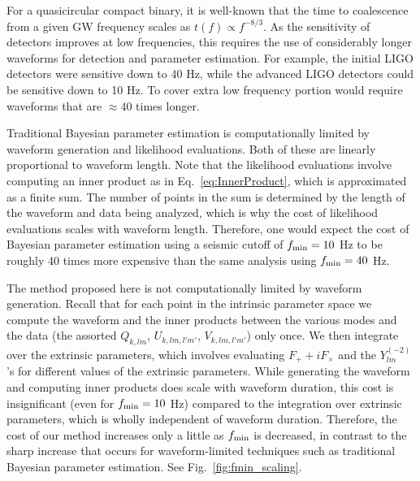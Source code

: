 For a quasicircular compact binary, it is well-known that the time to coalescence from a given GW frequency scales as
$t(f) \propto f^{-8/3}$. As the sensitivity of detectors improves at low frequencies, this requires the use of considerably
longer waveforms for detection and parameter estimation. For example, the initial LIGO detectors were sensitive down
to 40 Hz, while the advanced LIGO detectors could be sensitive down to 10 Hz. To cover extra low frequency
portion would require waveforms that are $\approx 40$ times longer.

Traditional Bayesian parameter estimation is computationally limited by waveform generation and
likelihood evaluations. Both of these are linearly proportional to waveform length. Note that the likelihood evaluations 
involve computing an inner product as in Eq.~\ref{eq:InnerProduct}, 
which is approximated as a finite sum. The number of points in the sum is determined by the length of the waveform 
and data being analyzed, which is why the cost of likelihood evaluations scales with waveform length.
Therefore, one would expect the cost of Bayesian parameter estimation using a seismic cutoff of $f_{\rm min} = 10$ Hz
to be roughly 40 times more expensive than the same analysis using $f_{\rm min} = 40$ Hz.

The method proposed here is not computationally limited by waveform generation. Recall that for each point
in the intrinsic parameter space we compute the waveform and the inner products between the various modes
and the data (the assorted $Q_{k,lm}$, $U_{k,lm,l'm'}$, $V_{k,lm,l'm'}$) only once. We then integrate over the 
extrinsic parameters, which involves evaluating $F_+ + i F_\times$ and the $Y^{(-2)}_{lm}$'s for 
different values of the extrinsic parameters.
While generating the waveform and computing inner products does scale with waveform duration, 
this cost is insignificant (even for $f_{\rm min}=10$ Hz) compared to the integration over extrinsic parameters,
which is wholly independent of waveform duration.
Therefore, the cost of our method increases only a little as $f_{\rm min}$ is decreased, in contrast to the sharp
increase that occurs for waveform-limited techniques such as traditional Bayesian parameter estimation.
See Fig.~\ref{fig:fmin_scaling}.



